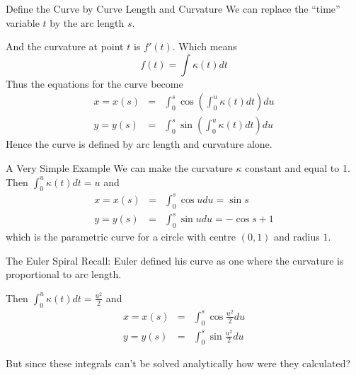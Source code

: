 \documentclass{beamer}
\begin{document}
\begin{frame}{Define the Curve by Curve Length and Curvature}
	We can replace the ``time'' variable $t$ by the arc length $s$.
	 
	And the curvature at point $t$ is $f'(t)$. Which means
	 \[
	 f(t) = \int \kappa(t) dt
	 \]
	Thus the equations for the curve become
	\begin{eqnarray*}
	x = x(s) &=& \int_{0}^{s} \cos \left( \int_0^u \kappa(t) dt \right) du \\
	y = y(s) &=& \int_{0}^{s} \sin \left( \int_0^u \kappa(t) dt \right) du
	\end{eqnarray*}
	Hence the curve is defined by arc length and curvature alone.
\end{frame}

\begin{frame}{A Very Simple Example}
	We can make the curvature $\kappa$ constant and equal to 1. Then 
	$ \int_0^u \kappa(t) dt = u $ and
	\begin{eqnarray*}
		x = x(s) &=& \int_{0}^{s} \cos u du = \sin s\\
		y = y(s) &=& \int_{0}^{s} \sin u du = - \cos s + 1
	\end{eqnarray*}
	which is the parametric curve for a circle with centre $(0, 1)$ and radius $1$.
	
\end{frame}


\begin{frame}{The Euler Spiral}
	Recall: Euler defined his curve as one where the curvature is proportional to arc length.
	
	\begin{center}
	\end{center}
	Then 
	$ \int_0^u \kappa(t) dt = \frac{u^2}{2} $ and
	\begin{eqnarray*}
		x = x(s) &=& \int_{0}^{s} \cos \frac{u^2}{2} du\\
		y = y(s) &=& \int_{0}^{s} \sin \frac{u^2}{2} du
	\end{eqnarray*}

	But since these integrals can't be solved analytically how were they calculated?
\end{frame}
\end{document}
